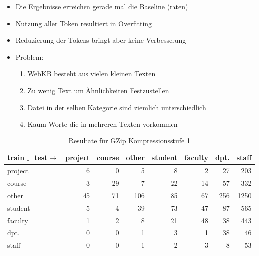 \begin{frame}[c]
	\begin{itemize}
	  \item Die Ergebnisse erreichen gerade mal die Baseline (raten)
	  \item Nutzung aller Token resultiert in Overfitting
	  \item Reduzierung der Tokens bringt aber keine Verbesserung
	  \item Problem:
	  \begin{enumerate}
	    \item WebKB besteht aus vielen kleinen Texten
	    \item Zu wenig Text um Ähnlichkeiten Festzustellen
	    \item Datei in der selben Kategorie sind ziemlich unterschiedlich
	    \item Kaum Worte die in mehreren Texten vorkommen
	  \end{enumerate}
	\end{itemize}
\end{frame}

\begin{frame}[c]
\begin{itemize}
 \begin{table}[htbp]
\begin{tabular}{|l|r|r|r|r|r|r|r|}
\hline
train$\downarrow$ test$\rightarrow$& \multicolumn{1}{l|}{project} &
\multicolumn{1}{l|}{course} & \multicolumn{1}{l|}{other} & \multicolumn{1}{l|}{student} &
\multicolumn{1}{l|}{faculty} & \multicolumn{1}{l|}{dpt.} &
\multicolumn{1}{l|}{staff} \\ \hline project & 6 & 0 & 5 & 8 & 2 & 27 & 203 \\ \hline course & 3 & 29 & 7 & 22 & 14 & 57 & 332 \\ \hline other & 45 & 71 & 106 & 85 & 67 & 256 & 1250 \\ \hline
student & 5 & 4 & 39 & 73 & 47 & 87 & 565 \\ \hline
faculty & 1 & 2 & 8 & 21 & 48 & 38 & 443 \\ \hline
dpt. & 0 & 0 & 1 & 3 & 1 & 38 & 46 \\ \hline
staff & 0 & 0 & 1 & 2 & 3 & 8 & 53 \\ \hline
\end{tabular}
\caption{Resultate für GZip Kompressionsstufe 1}
\label{tbl:GzipL1}
\end{table}
 
\end{itemize}
\end{frame}

